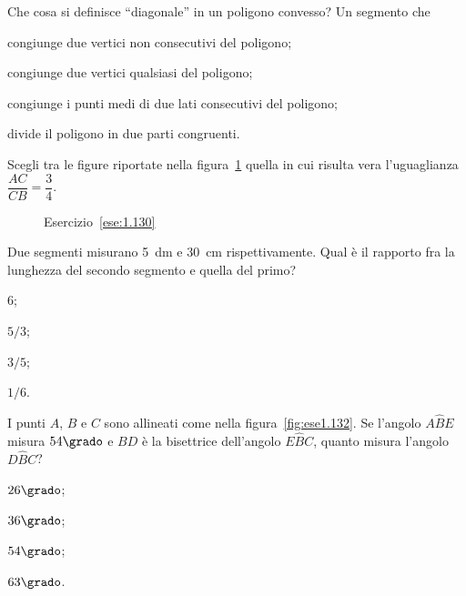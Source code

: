 
\begin{esercizio}
\label{ese:1.129}
Che cosa si definisce ``diagonale'' in un poligono convesso? Un 
segmento che
\begin{enumeratea}
\item congiunge due vertici non consecutivi del poligono;
\item congiunge due vertici qualsiasi del poligono;
\item congiunge i punti medi di due lati consecutivi del poligono;
\item divide il poligono in due parti congruenti.
\end{enumeratea}
\end{esercizio}

	
\begin{esercizio}
\label{ese:1.130}
Scegli tra le figure riportate nella figura~\ref{fig:ese1.130} quella 
in cui risulta vera l'uguaglianza \(\dfrac{AC}{CB}=\dfrac{3}{4}\).
\end{esercizio}


\begin{inaccessibleblock}
 \begin{figure}[htb]
 \centering
 \caption{Esercizio~\ref{ese:1.130}}\label{fig:ese1.130}
\end{figure}
\end{inaccessibleblock}

\begin{esercizio}
\label{ese:1.131}
Due segmenti misurano 5~dm e 30~cm rispettivamente. Qual è il 
rapporto fra la lunghezza del secondo segmento e quella del primo?
\begin{multicols}{4}
\begin{enumeratea}
\item 6;
\item \(5/3\);
\item \(3/5\);
\item \(1/6\).
\end{enumeratea}
\end{multicols}
\end{esercizio}

\begin{esercizio}
\label{ese:1.132}
I punti \(A\), \(B\) e \(C\) sono allineati come nella 
figura~\ref{fig:ese1.132}. Se l'angolo \(A\widehat{B}E\) misura 
\(54\grado\) e \(BD\) è la bisettrice dell'angolo \(E\widehat{B}C\), quanto 
misura l'angolo \(D\widehat{B}C\)?
\begin{multicols}{4}
\begin{enumeratea}
\item \(26\grado\);
\item \(36\grado\);
\item \(54\grado\);
\item \(63\grado\).
\end{enumeratea}
\end{multicols}
\end{esercizio}


